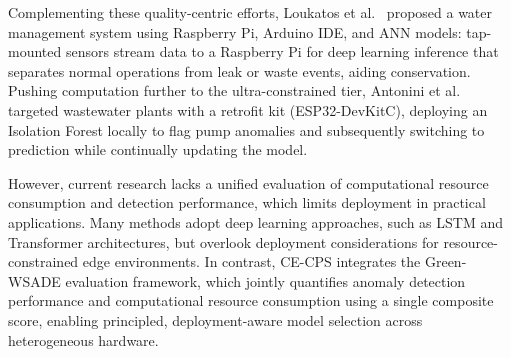 \documentclass[pdflatex,sn-mathphys-num]{sn-jnl}%
\theoremstyle{thmstyleone}
\theoremstyle{thmstyletwo}%
\theoremstyle{thmstylethree}%
\begin{document}
Complementing these quality-centric efforts, Loukatos et al.~\cite{loukatos2022enriching} proposed a water management system using Raspberry Pi, Arduino IDE, and ANN models: tap-mounted sensors stream data to a Raspberry Pi for deep learning inference that separates normal operations from leak or waste events, aiding conservation.
Pushing computation further to the ultra-constrained tier, Antonini et al.~\cite{antonini2022tinyml} targeted wastewater plants with a retrofit kit (ESP32-DevKitC), deploying an Isolation Forest locally to flag pump anomalies and subsequently switching to prediction while continually updating the model.

However, current research lacks a unified evaluation of computational resource consumption and detection performance, which limits deployment in practical applications. Many methods adopt deep learning approaches, such as LSTM and Transformer architectures, but overlook deployment considerations for resource-constrained edge environments. In contrast, CE-CPS integrates the Green-WSADE evaluation framework, which jointly quantifies anomaly detection performance and computational resource consumption using a single composite score, enabling principled, deployment-aware model selection across heterogeneous hardware.


\newcommand{\yes}{\faCheck}
\newcommand{\no}{\faTimes}
\end{document}

